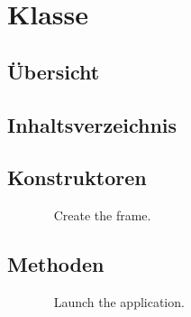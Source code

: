 
\section[Broswere]{Klasse }\label{ontologyFramework.OFErrorManagement.OFGUI.allInstancesGUI.Broswere-class}
\subsection{Übersicht}

\subsection{Inhaltsverzeichnis}
\subsection{Konstruktoren}
\begin{description}
\item[{\label{ontologyFramework.OFErrorManagement.OFGUI.allInstancesGUI.Broswere()}}]
~ Create the frame.
\end{description}
\subsection{Methoden}
\begin{description}
\item[{\label{ontologyFramework.OFErrorManagement.OFGUI.allInstancesGUI.Broswere.openBroswer()}}]
~ Launch the application.
\end{description}
